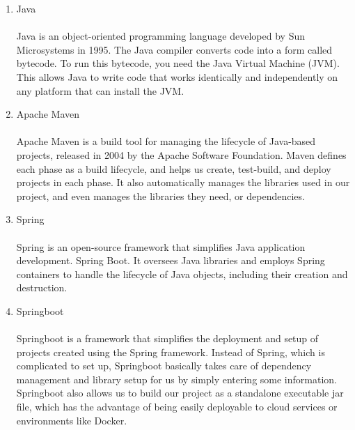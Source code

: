 \begin{enumerate}[label=\arabic*]
\begin{enumerate}[label=\alph*.]
            \item Java\\
            \\
            Java is an object-oriented programming language developed by Sun Microsystems in 1995. The Java compiler converts code into a form called bytecode. To run this bytecode, you need the Java Virtual Machine (JVM). This allows Java to write code that works identically and independently on any platform that can install the JVM. \\

            \item Apache Maven\\
            \\
            Apache Maven is a build tool for managing the lifecycle of Java-based projects, released in 2004 by the Apache Software Foundation. Maven defines each phase as a build lifecycle, and helps us create, test-build, and deploy projects in each phase. It also automatically manages the libraries used in our project, and even manages the libraries they need, or dependencies.\\

            \item Spring\\
            \\
            Spring is an open-source framework that simplifies Java application development. Spring Boot. It oversees Java libraries and employs Spring containers to handle the lifecycle of Java objects, including their creation and destruction.\\

            \item Springboot\\
            \\
            Springboot is a framework that simplifies the deployment and setup of projects created using the Spring framework. Instead of Spring, which is complicated to set up, Springboot basically takes care of dependency management and library setup for us by simply entering some information. Springboot also allows us to build our project as a standalone executable jar file, which has the advantage of being easily deployable to cloud services or environments like Docker.\\


\end{enumerate}
\end{enumerate}
